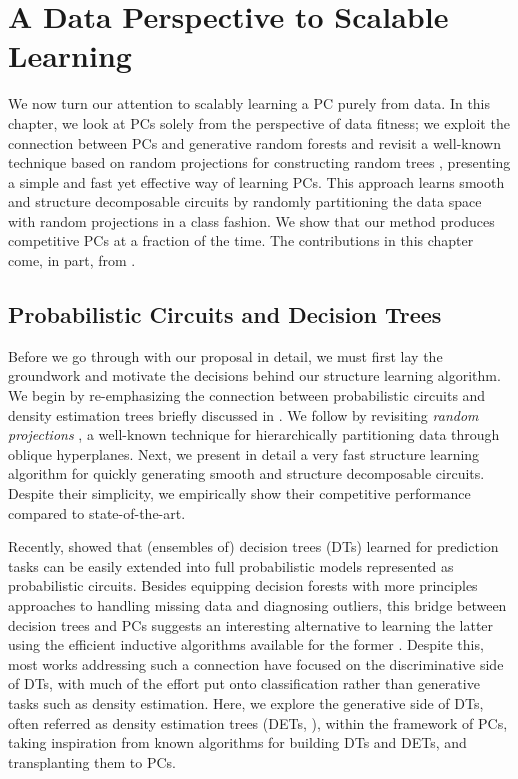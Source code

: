 \chapter{A Data Perspective to Scalable Learning}
\label{ch:data}

We now turn our attention to scalably learning a PC purely from data. In this chapter, we look at
PCs solely from the perspective of data fitness; we exploit the connection between PCs and
generative random forests \citep{correia20,ho95} and revisit a well-known technique based on random
projections for constructing random trees \citep{dasgupta08a,dasgupta08b}, presenting a simple and
fast yet effective way of learning PCs. This approach learns smooth and structure decomposable
circuits by randomly partitioning the data space with random projections in a \divclass{} class
fashion. We show that our method produces competitive PCs at a fraction of the time. The
contributions in this chapter come, in part, from \citet{geh21b}.

\section{Probabilistic Circuits and Decision Trees}
\label{sec:data}

Before we go through with our proposal in detail, we must first lay the groundwork and motivate the
decisions behind our structure learning algorithm. We begin by re-emphasizing the connection
between probabilistic circuits and density estimation trees briefly discussed in . We
follow by revisiting \emph{random projections} \citep{dasgupta08a,dasgupta08b}, a well-known
technique for hierarchically partitioning data through oblique hyperplanes. Next, we present in
detail a very fast structure learning algorithm for quickly generating smooth and structure
decomposable circuits. Despite their simplicity, we empirically show their competitive performance
compared to state-of-the-art.

Recently, \citet{correia20} showed that (ensembles of) decision trees (DTs) learned for prediction
tasks can be easily extended into full probabilistic models represented as probabilistic circuits.
Besides equipping decision forests with more principles approaches to handling missing data and
diagnosing outliers, this bridge between decision trees and PCs suggests an interesting alternative
to learning the latter using the efficient inductive algorithms available for the former
\citep{correia20,ram11,khosravi20}. Despite this, most works addressing such a connection have
focused on the discriminative side of DTs, with much of the effort put onto classification rather
than generative tasks such as density estimation. Here, we explore the generative side of DTs,
often referred as density estimation trees (DETs, \cite{ram11,hang19,smyth95}), within the framework
of PCs, taking inspiration from known algorithms for building DTs and DETs, and transplanting them
to PCs. 

